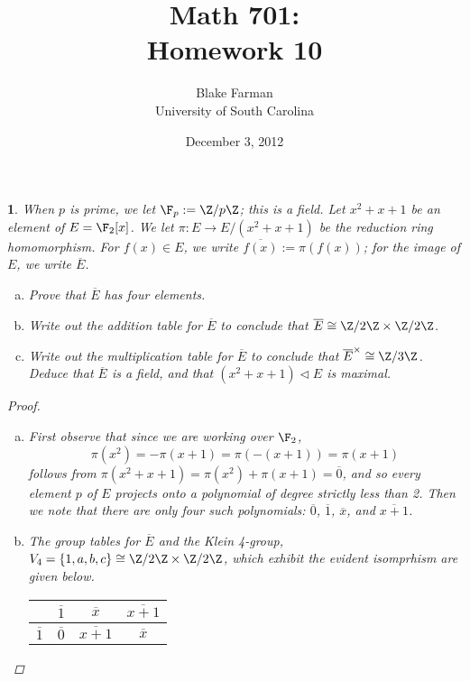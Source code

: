 \documentclass[10pt]{amsart}
\author{Blake Farman\\University of South Carolina}
\title{Math 701:\\Homework 10}
\date{December 3, 2012}
\begin{document}
\maketitle

\providecommand{\p}{\mathfrak{p}}
\providecommand{\m}{\mathfrak{m}}

\newtheorem{thm}{}
\newtheorem{lem}{Lemma}

\begin{thm}
  When $p$ is prime, we let $\F_p := \Z/p\Z$; this is a field.
  Let $x^2 + x + 1$ be an element of $E = \F_2[x]$.
  We let $\pi \colon E \rightarrow E/(x^2 + x + 1)$ be the reduction ring homomorphism.
  For $f(x) \in E$, we write $\overline{f(x)} := \pi(f(x))$; for the image of $E$, we write $\overline{E}$.
  \begin{enumerate}[(a)]
  \item
    Prove that $\overline{E}$ has four elements.
  \item
    Write out the addition table for $\overline{E}$ to conclude that $\overline{E} \cong \Z/2\Z \times \Z/2\Z$.
  \item
    Write out the multiplication table for $\overline{E}$ to conclude that $\overline{E}^{\times} \cong \Z/3\Z$.
    Deduce that $\overline{E}$ is a field, and that $(x^2 + x + 1) \lhd E$ is maximal.
  \end{enumerate}
  \begin{proof}
    \begin{enumerate}[(a)]
    \item
      First observe that since we are working over $\F_2$, $$\pi(x^2) = -\pi(x + 1) = \pi(-(x + 1)) = \pi(x + 1)$$ follows from $\pi(x^2 + x + 1) = \pi(x^2) + \pi(x + 1) = \overline{0}$, and so every element $p$ of $E$ projects onto a polynomial of degree strictly less than 2.
      Then we note that there are only four such polynomials: $\overline{0}$, $\overline{1}$, $\overline{x}$, and $\overline{x + 1}$.
      \item
        The group tables for $\overline{E}$ and the Klein 4-group, $V_4 = \left\{1,a,b,c\right\} \cong \Z/2\Z \times \Z/2\Z$, which exhibit the evident isomprhism are given below.\\
      \begin{center}
        \begin{tabular}{|c||c|c|c|}
        \hline
        & $\overline{1}$ & $\overline{x}$ & $\overline{x + 1}$\\
        \hline
        \hline
        $\overline{1}$ & $\overline{0}$ & $\overline{x+1}$ & $\overline{x}$\\

\end{tabular}
\end{center}
\end{enumerate}
\end{proof}
\end{thm}
\end{document}
